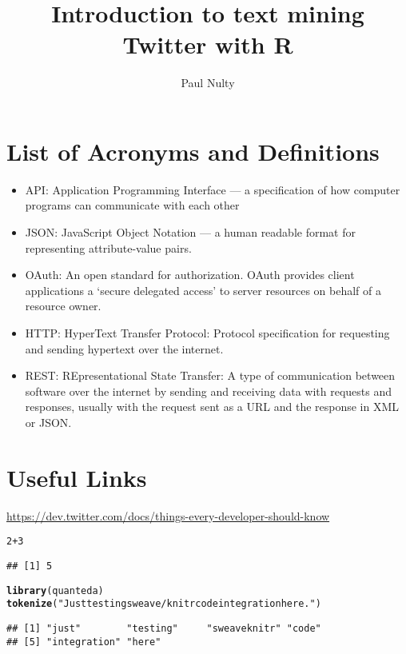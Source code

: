 \documentclass{article}\usepackage[]{graphicx}\usepackage[]{color}
\title{Introduction to text mining Twitter with R}
\author{Paul Nulty}
\makeatletter
\newcommand{\hlnum}[1]{\textcolor[rgb]{0.686,0.059,0.569}{#1}}%
\newcommand{\hlstr}[1]{\textcolor[rgb]{0.192,0.494,0.8}{#1}}%
\newcommand{\hlopt}[1]{\textcolor[rgb]{0,0,0}{#1}}%
\newcommand{\hlstd}[1]{\textcolor[rgb]{0.345,0.345,0.345}{#1}}%
\newcommand{\hlkwd}[1]{\textcolor[rgb]{0.737,0.353,0.396}{\textbf{#1}}}%
\newenvironment{kframe}{%
 \def\at@end@of@kframe{}%
 \ifinner\ifhmode%
  \def\at@end@of@kframe{\end{minipage}}%
  \begin{minipage}{\columnwidth}%
 \fi\fi%
 \def\FrameCommand##1{\hskip\@totalleftmargin \hskip-\fboxsep
 \colorbox{shadecolor}{##1}\hskip-\fboxsep
     \hskip-\linewidth \hskip-\@totalleftmargin \hskip\columnwidth}%
 \MakeFramed {\advance\hsize-\width
   \@totalleftmargin\z@ \linewidth\hsize
   \@setminipage}}%
 {\par\unskip\endMakeFramed%
 \at@end@of@kframe}
\newenvironment{knitrout}{}{} %
\makeatother
\begin{document}
\maketitle
\clearpage

\section*{List of Acronyms and Definitions}
\begin{itemize}
  \item API: Application Programming Interface --- a specification of how computer programs can communicate with each other
  \item JSON: JavaScript Object Notation --- a human readable format for representing attribute-value pairs.
  \item OAuth: An open standard for authorization. OAuth provides client applications a `secure delegated access' to server resources on behalf of a resource owner.
  \item HTTP: HyperText Transfer Protocol: Protocol specification for requesting and sending hypertext over the internet.
  \item REST: REpresentational State Transfer: A type of communication between software over the internet by sending and receiving data with requests and responses, usually with the request sent as a URL and the response in XML or JSON.
\end{itemize}

\section*{Useful Links}
\url{https://dev.twitter.com/docs/things-every-developer-should-know}

\clearpage


\begin{knitrout}
\color{fgcolor}\begin{kframe}
\begin{alltt}
\hlnum{2}\hlopt{+}\hlnum{3}
\end{alltt}
\begin{verbatim}
## [1] 5
\end{verbatim}
\begin{alltt}
\hlkwd{library}\hlstd{(quanteda)}
\hlkwd{tokenize}\hlstd{(}\hlstr{"Just testing sweave/knitr code integration here."}\hlstd{)}
\end{alltt}
\begin{verbatim}
## [1] "just"        "testing"     "sweaveknitr" "code"       
## [5] "integration" "here"
\end{verbatim}
\end{kframe}
\end{knitrout}
\end{document}
